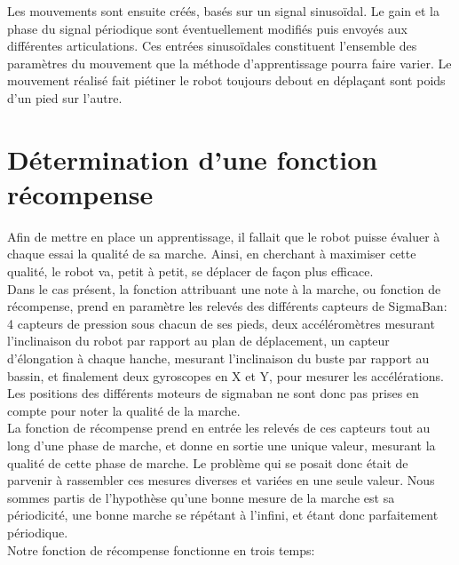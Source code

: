 \documentclass[11pt]{article}
\begin{document}
Les mouvements sont ensuite créés, basés sur un signal sinusoïdal. Le gain et la phase du signal périodique 
sont éventuellement modifiés puis envoyés aux différentes articulations. Ces entrées sinusoïdales constituent l'ensemble des paramètres du mouvement que la méthode d'apprentissage pourra faire varier. Le mouvement réalisé fait piétiner le robot 
toujours debout en déplaçant sont poids d'un pied sur l'autre.

\section{Détermination d'une fonction récompense}
Afin de mettre en place un apprentissage, il fallait que le robot puisse évaluer à chaque essai la qualité de sa marche. Ainsi, en cherchant à maximiser cette qualité, le robot va, petit à petit, se déplacer de façon plus efficace.\\
Dans le cas présent, la fonction attribuant une note à la marche, ou fonction de récompense, prend en paramètre les relevés des différents capteurs de SigmaBan: 4 capteurs de pression sous chacun de ses pieds, deux accéléromètres mesurant l'inclinaison du robot par rapport au plan de déplacement, un capteur d'élongation à chaque hanche, mesurant l'inclinaison du buste par rapport au bassin, et finalement deux gyroscopes en X et Y, pour mesurer les accélérations. Les positions des différents moteurs de sigmaban ne sont donc pas prises en compte pour noter la qualité de la marche.\\
La fonction de récompense prend en entrée les relevés de ces capteurs tout au long d'une phase de marche, et donne en sortie une unique valeur, mesurant la qualité de cette phase de marche. Le problème qui se posait donc était de parvenir à rassembler ces mesures diverses et variées en une seule valeur. Nous sommes partis de l'hypothèse qu'une bonne mesure de la marche est sa périodicité, une bonne marche se répétant à l'infini, et étant donc parfaitement périodique.\\
Notre fonction de récompense fonctionne en trois temps:
\end{document}
